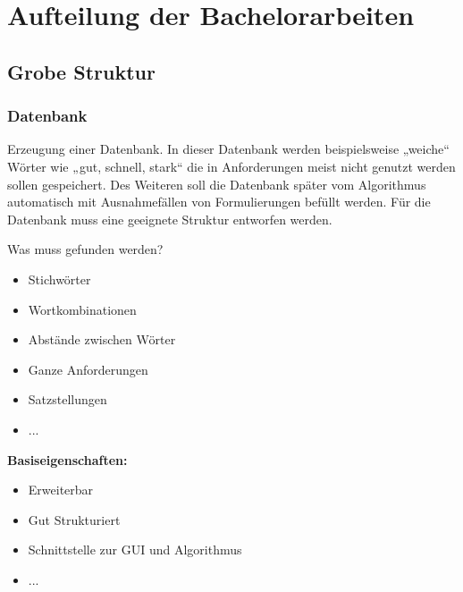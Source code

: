 \chapter{Aufteilung der Bachelorarbeiten}

\section{Grobe Struktur}

	\subsection{Datenbank}
		Erzeugung einer Datenbank. In dieser Datenbank werden beispielsweise „weiche“ Wörter wie „gut, schnell, stark“ die in Anforderungen meist nicht genutzt werden sollen gespeichert. Des Weiteren soll die Datenbank später vom Algorithmus automatisch mit Ausnahmefällen von Formulierungen befüllt werden. Für die Datenbank muss eine geeignete Struktur entworfen werden.
		
		Was muss gefunden werden?
		\begin{itemize}
			\item 	Stichwörter
			\item	Wortkombinationen	
			\item 	Abstände zwischen Wörter
			\item	Ganze Anforderungen 
			\item 	Satzstellungen
			\item 	...
		\end{itemize}
		
		\textbf{Basiseigenschaften:}
		\begin{itemize}
			\item 	Erweiterbar
			\item	Gut Strukturiert	
			\item 	Schnittstelle zur GUI und Algorithmus
			\item	...
		\end{itemize}